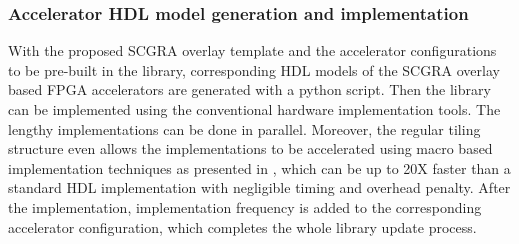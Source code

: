 \subsubsection{Accelerator HDL model generation and implementation}
With the proposed SCGRA overlay template and the accelerator configurations to be pre-built in the
library, corresponding HDL models of the SCGRA overlay based FPGA accelerators are generated with a
python script. Then the library can be implemented using the conventional hardware implementation
tools. The lengthy implementations can be done in parallel. Moreover, the regular tiling structure
even allows the implementations to be accelerated using macro based implementation techniques as
presented in \cite{ROB2014}, which can be up to 20X faster than a standard HDL implementation with
negligible timing and overhead penalty. After the implementation, implementation frequency is
added to the corresponding accelerator configuration, which completes the whole library update process.

